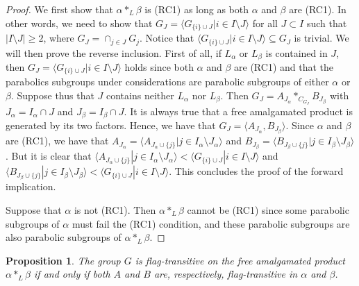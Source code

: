 \documentclass[11pt,letterpaper]{amsart}
\newtheorem{prop}{Proposition}[section]
\begin{document}
\begin{proof}
    We first show that $\alpha *_L \beta$ is (RC1) as long as both $\alpha$ and $\beta$ are (RC1). In other words, we need to show that $G_J = \langle G_{\{i\} \cup J} | i \in I \setminus J \rangle$ for all $J \subset I$ such that $|I \setminus J| \geq 2$, where $G_J = \cap_{j \in J} G_j$.
    Notice that $\langle G_{\{i\} \cup J} | i \in I \setminus J \rangle \subseteq G_J$ is trivial. We will then prove the reverse inclusion.
    First of all, if $L_\alpha$ or $L_\beta$ is contained in $J$, then $G_J = \langle G_{\{i\} \cup J} | i \in I \setminus J \rangle$ holds since both $\alpha$ and $\beta$ are (RC1) and that the parabolics subgroups under considerations are parabolic subgroups of either $\alpha$ or $\beta$. Suppose thus that $J$ contains neither $L_\alpha$ nor $L_\beta$. 
    Then $G_J = A_{J_\alpha} *_{C_{G_J}} B_{J_\beta}$ with $J_\alpha = I_\alpha \cap J$ and $J_\beta = I_\beta \cap J$. It is always true that a free amalgamated product is generated by its two factors. Hence, we have that $G_J = \langle A_{J_\alpha} , B_{J_\beta} \rangle$. Since $\alpha$ and $\beta$ are (RC1), we have that $A_{J_\alpha} = \langle A_{J_\alpha \cup \{j\}} | j \in I_\alpha \setminus J_\alpha \rangle$ and $B_{J_\beta} = \langle B_{J_\beta \cup \{j\}} | j \in I_\beta \setminus J_\beta \rangle$. But it is clear that $\langle A_{J_\alpha \cup \{j\}} | j \in I_\alpha \setminus J_\alpha \rangle < \langle  G_{\{i\} \cup J} | i \in I \setminus J \rangle$ and $\langle B_{J_\beta \cup \{j\}} | j \in I_\beta \setminus J_\beta \rangle < \langle  G_{\{i\} \cup J} | i \in I \setminus J \rangle.$ This concludes the proof of the forward implication.

    Suppose that $\alpha$ is not (RC1). Then $\alpha *_L \beta$ cannot be (RC1) since some parabolic subgroups of $\alpha$ must fail the (RC1) condition, and these parabolic subgroups are also parabolic subgroups of $\alpha *_L \beta$.
    
\end{proof}

\begin{prop}\label{prop:FT_FPAmalg}
        The group $G$ is flag-transitive on the free amalgamated product $\alpha *_L \beta$ if and only if both $A$ and $B$ are, respectively, flag-transitive in $\alpha$ and $\beta$.
\end{prop}
\end{document}
